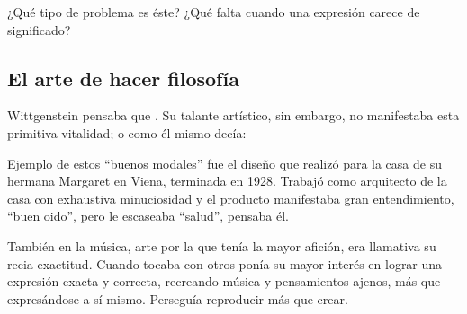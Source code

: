 ¿Qué tipo de problema es éste? ¿Qué falta cuando una expresión carece de
significado?

\subsection{El arte de hacer filosofía}

Wittgenstein pensaba que
\autocite[p.~43e]{wittgenstein1998cnv}. Su talante artístico, sin
embargo, no manifestaba esta primitiva vitalidad; o como él mismo decía:
\autocite[p.~29e]{wittgenstein1998cnv}

Ejemplo de estos ``buenos modales'' fue el diseño que realizó para la casa de su
hermana Margaret en Viena, terminada en 1928.
Trabajó como arquitecto de la casa con exhaustiva minuciosidad y el producto
manifestaba gran entendimiento, ``buen oido'', pero le escaseaba ``salud'',
pensaba él.\autocite[p.~43e]{wittgenstein1998cnv}


También en la música, arte por la que tenía la mayor afición, era llamativa su
recia exactitud. Cuando tocaba con otros ponía su mayor interés en lograr una
expresión exacta y correcta, recreando música y pensamientos ajenos, más que
expresándose a sí mismo. Perseguía reproducir más que
crear.\autocite[loc.˜]{monk1991duty}

